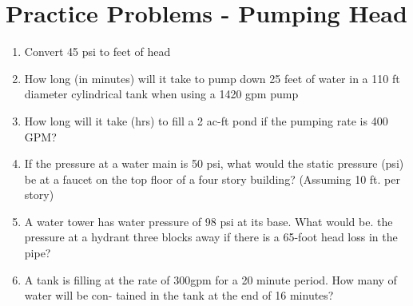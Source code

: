 \section*{Practice Problems - Pumping Head}
\begin{enumerate}
\item Convert 45 psi to feet of head

\item How long (in minutes) will it take to pump down 25 feet of water in a 110 ft diameter cylindrical tank when using a 1420 gpm pump\\

\item How long will it take (hrs) to fill a 2 ac-ft pond if the pumping rate is 400 GPM?

\item If the pressure at a water main is 50 psi, what would the static pressure (psi) be at a faucet on the top floor of a four story building? (Assuming 10 ft. per story)

\item A water tower has water pressure of 98 psi at its base. What would be. the pressure at a hydrant three blocks away if there is a 65-foot head loss in the pipe?\\

\item A tank is filling at the rate of 300gpm for a 20 minute period. How many of water will be con- tained in the tank at the end of 16 minutes?



\end{enumerate}

